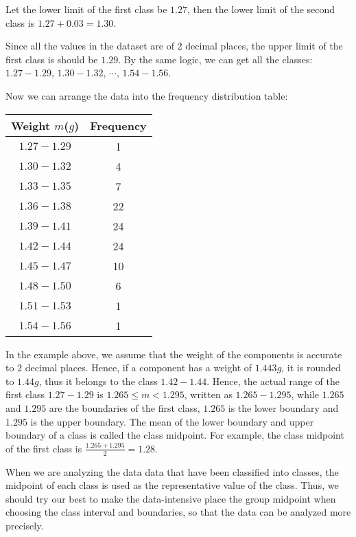 \documentclass{report}
\begin{document}
\begin{multicols}{2}
  Let the lower limit of the first class be $1.27$, then the lower limit of the
  second class is $1.27 + 0.03 = 1.30$.

  Since all the values in the dataset are of 2 decimal places, the upper limit of
  the first class is should be $1.29$. By the same logic, we can get all the
  classes: $1.27 - 1.29$, $1.30 - 1.32$, $\cdots$, $1.54 - 1.56$.

  Now we can arrange the data into the frequency distribution table:

  \begin{center}
    \begin{tabular}{|c|c|}
      \hline
      Weight $m$($g$) & Frequency \\
      \hline
      $1.27 - 1.29$   & 1         \\
      $1.30 - 1.32$   & 4         \\
      $1.33 - 1.35$   & 7         \\
      $1.36 - 1.38$   & 22        \\
      $1.39 - 1.41$   & 24        \\
      $1.42 - 1.44$   & 24        \\
      $1.45 - 1.47$   & 10        \\
      $1.48 - 1.50$   & 6         \\
      $1.51 - 1.53$   & 1         \\
      $1.54 - 1.56$   & 1         \\
      \hline
    \end{tabular}
  \end{center}

  In the example above, we assume that the weight of the components is accurate
  to 2 decimal places. Hence, if a component has a weight of $1.443g$, it is
  rounded to $1.44g$, thus it belongs to the class $1.42 - 1.44$. Hence, the
  actual range of the first class $1.27 - 1.29$ is $1.265 \leq m < 1.295$,
  written as $1.265 - 1.295$, while $1.265$ and $1.295$ are the boundaries of the
  first class, $1.265$ is the lower boundary and $1.295$ is the upper boundary.
  The mean of the lower boundary and upper boundary of a class is called the
  class midpoint. For example, the class midpoint of the first class is
  $\frac{1.265 + 1.295}{2} = 1.28$.

  When we are analyzing the data data that have been classified into classes, the
  midpoint of each class is used as the representative value of the class. Thus,
  we should try our best to make the data-intensive place the group midpoint when
  choosing the class interval and boundaries, so that the data can be analyzed
  more precisely.


\end{multicols}
\end{document}
